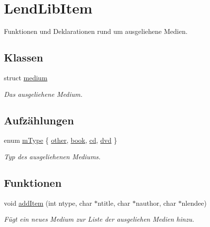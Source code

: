 \hypertarget{group___lend_lib_item}{}\section{Lend\+Lib\+Item}
\label{group___lend_lib_item}


Funktionen und Deklarationen rund um ausgeliehene Medien.  


\subsection*{Klassen}
\begin{DoxyCompactItemize}
\item 
struct \hyperlink{structmedium}{medium}
\begin{DoxyCompactList}\small\item\em Das ausgeliehene Medium. \end{DoxyCompactList}\end{DoxyCompactItemize}
\subsection*{Aufzählungen}
\begin{DoxyCompactItemize}
\item 
enum \hyperlink{group___lend_lib_item_ga636cfca014f3212ea82d45e28f9cb51b}{m\+Type} \{ \hyperlink{group___lend_lib_item_gga636cfca014f3212ea82d45e28f9cb51ba7e338ad381a84ef6df07e7d425707025}{other}, 
\hyperlink{group___lend_lib_item_gga636cfca014f3212ea82d45e28f9cb51ba6053cbf2a0d801307c80aec065560db6}{book}, 
\hyperlink{group___lend_lib_item_gga636cfca014f3212ea82d45e28f9cb51bae7dab93ee81e7f74327bed188e6f3748}{cd}, 
\hyperlink{group___lend_lib_item_gga636cfca014f3212ea82d45e28f9cb51ba9250e48899d18438f51e7df957e35ea5}{dvd}
 \}\begin{DoxyCompactList}\small\item\em Typ des ausgeliehenen Mediums. \end{DoxyCompactList}
\end{DoxyCompactItemize}
\subsection*{Funktionen}
\begin{DoxyCompactItemize}
\item 
void \hyperlink{group___lend_lib_item_gad6a03ef3e2d355fb8bb01792a69331c1}{add\+Item} (int ntype, char $\ast$ntitle, char $\ast$nauthor, char $\ast$nlendee)
\begin{DoxyCompactList}\small\item\em Fügt ein neues Medium zur Liste der ausgeliehen Medien hinzu. \end{DoxyCompactList}\end{DoxyCompactItemize}


